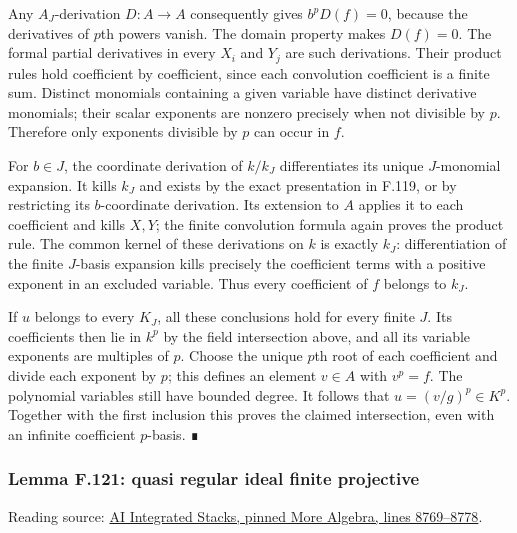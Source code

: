 \documentclass[11pt,a4paper,openany]{report}
\begin{document}
Any \(A_J\)-derivation \(D:A\to A\) consequently gives \(b^pD(f)=0\), because the derivatives of \(p\)th powers vanish. The domain property makes \(D(f)=0\). The formal partial derivatives in every \(X_i\) and \(Y_j\) are such derivations. Their product rules hold coefficient by coefficient, since each convolution coefficient is a finite sum. Distinct monomials containing a given variable have distinct derivative monomials; their scalar exponents are nonzero precisely when not divisible by \(p\). Therefore only exponents divisible by \(p\) can occur in \(f\).

For \(b\in J\), the coordinate derivation of \(k/k_J\) differentiates its unique \(J\)-monomial expansion. It kills \(k_J\) and exists by the exact presentation in F.119, or by restricting its \(b\)-coordinate derivation. Its extension to \(A\) applies it to each coefficient and kills \(X,Y\); the finite convolution formula again proves the product rule. The common kernel of these derivations on \(k\) is exactly \(k_J\): differentiation of the finite \(J\)-basis expansion kills precisely the coefficient terms with a positive exponent in an excluded variable. Thus every coefficient of \(f\) belongs to \(k_J\).

If \(u\) belongs to every \(K_J\), all these conclusions hold for every finite \(J\). Its coefficients then lie in \(k^p\) by the field intersection above, and all its variable exponents are multiples of \(p\). Choose the unique \(p\)th root of each coefficient and divide each exponent by \(p\); this defines an element \(v\in A\) with \(v^p=f\). The polynomial variables still have bounded degree. It follows that \(u=(v/g)^p\in K^p\). Together with the first inclusion this proves the claimed intersection, even with an infinite coefficient \(p\)-basis. ∎

\label{AG-RG-S05-more-algebra-lemma-quasi-regular-ideal-finite-projective}

\subsubsection{Lemma F.121: quasi regular ideal finite projective}\label{AG-RG-S05-lemma-f.121-quasi-regular-ideal-finite-projective}

Reading source: \href{https://github.com/KokunoYumeto/unofficial-stacks-project-ai-drafts/blob/565b10e987aba5969b21145a0833f42d69f96790/more-algebra.tex\#L8769-L8778}{AI Integrated Stacks, pinned More Algebra, lines 8769--8778}.
\end{document}
